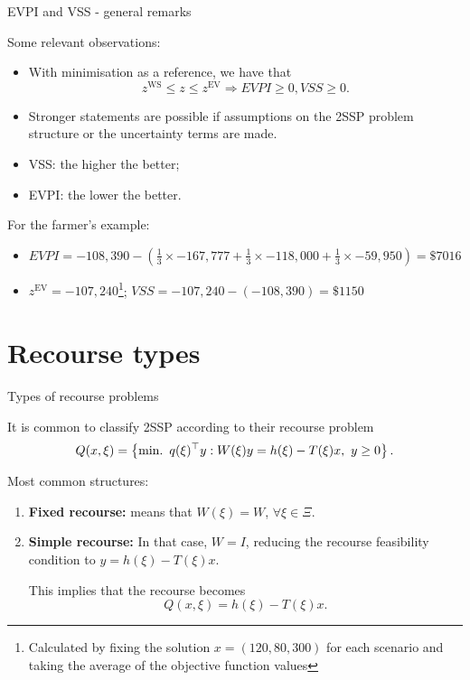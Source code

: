 	
\begin{frame}{EVPI and VSS - general remarks}

	Some relevant observations:
	\vspace{-6pt}
	\begin{itemize}
		\item With minimisation as a reference, we have that
		$$
			z^{\text{WS}} \le z \le z^{\text{EV}} \Rightarrow EVPI \ge 0, VSS \ge 0.
		$$
		\item Stronger statements are possible if assumptions on the 2SSP problem structure or the uncertainty terms are made.
		\item VSS: the \alert{higher} the better;
		\item EVPI: the \alert{lower} the better.
	\end{itemize}
	
	\pause
	For the farmer's example:
	\vspace{-6pt}
	\begin{itemize}
		\item $EVPI = -108,390- \left(\frac{1}{3}\times -167,777 + \frac{1}{3}\times -118,000 + \frac{1}{3}\times -59,950\right)  = \$7016$ 
		\item $z^{\text{EV}} = -107,240$\footnote{Calculated by fixing the solution $x=(120,80,300)$ for each scenario and taking the average of the objective function values}; $VSS = -107,240 - (-108,390) = \$1150$
	\end{itemize}
	\vfill
\end{frame}


\section{Recourse types}


\begin{frame}{Types of recourse problems}

	It is common to classify 2SSP according to their \alert{recourse problem} 
	\begin{equation*}
		Q(x, \xi) = \left\{ \mathop{\text{min.} \ } q(\xi)^\top y : W(\xi)y = h(\xi) - T(\xi)x, \ y \ge 0 \right \}.	
	\end{equation*}
	
	Most common structures:
	\begin{enumerate}[<+->]
		\item {\bf Fixed recourse:} means that $W(\xi) = W$, $\forall \xi \in \Xi$.
		\item {\bf Simple recourse:} In that case, $W = I$, reducing the recourse feasibility condition to $y = h(\xi) - T(\xi)x$. 
		\vspace{6pt}
		
		This implies that the recourse becomes
		$$
		 Q(x,\xi) = h(\xi) - T(\xi)x.
		$$ 
	\end{enumerate} 
	
\end{frame}


